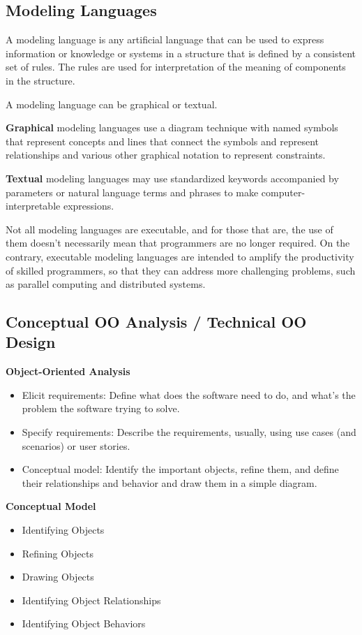 \documentclass[12pt,a4paper,titlepage]{article}
\begin{document}
\subsection{Modeling Languages}
A modeling language is any artificial language that can be used to express information or knowledge or systems in a structure that is defined by a consistent set of rules. The rules are used for interpretation of the meaning of components in the structure.\par
A modeling language can be graphical or textual.\par
\textbf{Graphical} modeling languages use a diagram technique with named symbols that represent concepts and lines that connect the symbols and represent relationships and various other graphical notation to represent constraints.\par
\textbf{Textual} modeling languages may use standardized keywords accompanied by parameters or natural language terms and phrases to make computer-interpretable expressions.\par
Not all modeling languages are executable, and for those that are, the use of them doesn't necessarily mean that programmers are no longer required. On the contrary, executable modeling languages are intended to amplify the productivity of skilled programmers, so that they can address more challenging problems, such as parallel computing and distributed systems.\par

\subsection{Conceptual OO Analysis / Technical OO Design}
\textbf{Object-Oriented Analysis}
\begin{itemize}  
	\item Elicit requirements: Define what does the software need to do, and what’s the problem the software trying to solve.
	\item Specify requirements: Describe the requirements, usually, using use cases (and scenarios) or user stories.
	\item Conceptual model: Identify the important objects, refine them, and define their relationships and behavior and draw them in a simple diagram.
\end{itemize}
\textbf{Conceptual Model}
\begin{itemize}  
	\item Identifying Objects
	\item Refining Objects
	\item Drawing Objects
	\item Identifying Object Relationships
	\item Identifying Object Behaviors
\end{itemize}
\end{document}
